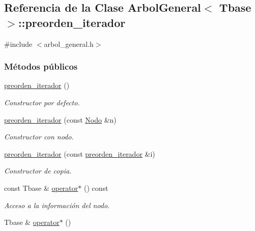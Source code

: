 \hypertarget{classArbolGeneral_1_1preorden__iterador}{}\subsection{Referencia de la Clase Arbol\+General$<$ Tbase $>$\+:\+:preorden\+\_\+iterador}
\label{classArbolGeneral_1_1preorden__iterador}


{\ttfamily \#include $<$arbol\+\_\+general.\+h$>$}

\subsubsection*{Métodos públicos}
\begin{DoxyCompactItemize}
\item 
\hyperlink{classArbolGeneral_1_1preorden__iterador_a1ad7d0b716beb169de08516187b002e4}{preorden\+\_\+iterador} ()
\begin{DoxyCompactList}\small\item\em Constructor por defecto. \end{DoxyCompactList}\item 
\hyperlink{classArbolGeneral_1_1preorden__iterador_a3b2071c95cde719c132e53f1a8838bdb}{preorden\+\_\+iterador} (const \hyperlink{classArbolGeneral_a12cc1b74a9095d89bc7334290d332f7a}{Nodo} \&n)
\begin{DoxyCompactList}\small\item\em Constructor con nodo. \end{DoxyCompactList}\item 
\hyperlink{classArbolGeneral_1_1preorden__iterador_a4d412bb22cc8e2aebcb2bbefb0b78a4b}{preorden\+\_\+iterador} (const \hyperlink{classArbolGeneral_1_1preorden__iterador}{preorden\+\_\+iterador} \&i)
\begin{DoxyCompactList}\small\item\em Constructor de copia. \end{DoxyCompactList}\item 
const Tbase \& \hyperlink{classArbolGeneral_1_1preorden__iterador_a35a1c5648f0bef4c687eeaa742fd98f7}{operator$\ast$} () const
\begin{DoxyCompactList}\small\item\em Acceso a la información del nodo. \end{DoxyCompactList}\item 
Tbase \& \hyperlink{classArbolGeneral_1_1preorden__iterador_a2336e1008cac3a859337da8fc24075d0}{operator$\ast$} ()

\end{DoxyCompactItemize}
